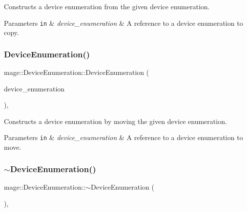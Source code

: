 Constructs a device enumeration from the given device enumeration.


\begin{DoxyParams}[1]{Parameters}
\mbox{\tt in}  & {\em device\+\_\+enumeration} & A reference to a device enumeration to copy. \\
\hline
\end{DoxyParams}
\hypertarget{classmage_1_1_device_enumeration_a99cb1ad03813e68872e97a04c6388bc2}{}\label{classmage_1_1_device_enumeration_a99cb1ad03813e68872e97a04c6388bc2} 
\subsubsection{\texorpdfstring{Device\+Enumeration()}{DeviceEnumeration()}\hspace{0.1cm}{\footnotesize\ttfamily [3/3]}}
{\footnotesize\ttfamily mage\+::\+Device\+Enumeration\+::\+Device\+Enumeration (\begin{DoxyParamCaption}\item[{\hyperlink{classmage_1_1_device_enumeration}{Device\+Enumeration} \&\&}]{device\+\_\+enumeration }\end{DoxyParamCaption})\hspace{0.3cm}{\ttfamily [private]}, {\ttfamily [default]}}

Constructs a device enumeration by moving the given device enumeration.


\begin{DoxyParams}[1]{Parameters}
\mbox{\tt in}  & {\em device\+\_\+enumeration} & A reference to a device enumeration to move. \\
\hline
\end{DoxyParams}
\hypertarget{classmage_1_1_device_enumeration_a6a8cfc259c1e8c98ba0a9780c42a5ffe}{}\label{classmage_1_1_device_enumeration_a6a8cfc259c1e8c98ba0a9780c42a5ffe} 
\subsubsection{\texorpdfstring{$\sim$\+Device\+Enumeration()}{~DeviceEnumeration()}}
{\footnotesize\ttfamily mage\+::\+Device\+Enumeration\+::$\sim$\+Device\+Enumeration (\begin{DoxyParamCaption}{ }\end{DoxyParamCaption})\hspace{0.3cm}{\ttfamily [private]}, {\ttfamily [default]}}

